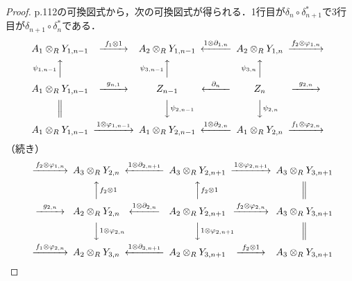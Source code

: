 \begin{proof}
  p.112の可換図式から，次の可換図式が得られる．1行目が$\delta_n \circ \delta_{n+1}^\ast$で3行目が$\delta_{n+1} \circ \delta_n^\ast$である．
  \[
  \begin{CD}
    A_1 \otimes_R Y_{1, n-1} @>{f_1 \otimes 1}>> A_2 \otimes_R Y_{1, n-1} @<{1 \otimes \partial_{1, n}}<< A_2 \otimes_R Y_{1, n} @>{f_2 \otimes \varphi_{1, n}}>> \\
    @A{\psi_{1, n-1}}AA @A{\psi_{3, n-1}}AA @A{\psi_{3, n}}AA \\
    A_1 \otimes_R Y_{1, n-1} @>{g_{n, 1}}>> Z_{n-1} @<{\partial_n}<< Z_n  @>{g_{2,n}}>> \\
    @| @VV{\psi_{2, n-1}}V @VV{\psi_{2, n}}V \\
    A_1 \otimes_R Y_{1, n-1} @>{1 \otimes \varphi_{1, n-1}}>> A_1 \otimes_R Y_{2, n-1} @<{1 \otimes \partial_{2, n}}<< A_1 \otimes_R Y_{2, n} @>{f_1 \otimes \varphi_{2, n}}>>
  \end{CD}
  \]
  （続き）
  \[
  \begin{CD}
    @>{f_2 \otimes \varphi_{1, n}}>>  A_3 \otimes_R Y_{2, n} @<{1 \otimes \partial_{2, n+1}}<< A_3 \otimes_R Y_{2, n+1} @>{1 \otimes \varphi_{2, n+1}}>> A_3 \otimes_R Y_{3, n+1} \\
    @. @AA{f_2 \otimes 1}A @AA{f_2 \otimes 1}A @| \\
    @>{g_{2,n}}>>  A_2 \otimes_R Y_{2, n} @<{1 \otimes \partial_{2, n}}<< A_2 \otimes_R Y_{2, n+1} @>{f_2 \otimes \varphi_{2, n}}>> A_3 \otimes_R Y_{3, n+1} \\
    @. @VV{1 \otimes \varphi_{2, n}}V @VV{1 \otimes \varphi_{2, n+1}}V @| \\
    @>{f_1 \otimes \varphi_{2, n}}>> A_2 \otimes_R Y_{3, n} @<{1 \otimes \partial_{3, n+1}}<< A_2 \otimes_R Y_{3, n+1} @>{f_2 \otimes 1}>> A_3 \otimes_R Y_{3, n+1}
  \end{CD}
  \]

\end{proof}
